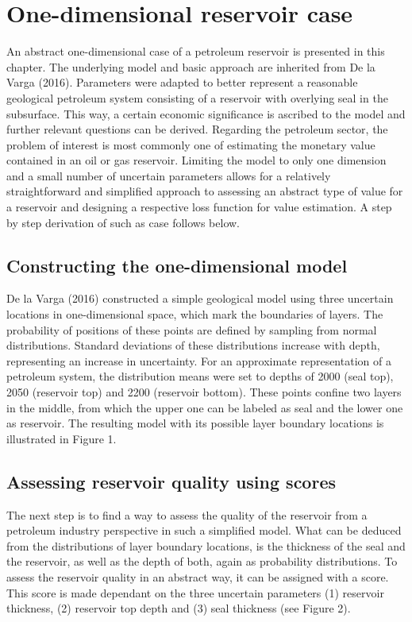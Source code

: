 \chapter{One-dimensional reservoir case}

An abstract one-dimensional case of a petroleum reservoir is presented in this chapter. The underlying model and basic approach are inherited from De la Varga (2016). Parameters were adapted to better represent a reasonable geological petroleum system consisting of a reservoir with overlying seal in the subsurface. This way, a certain economic significance is ascribed to the model and further relevant questions can be derived. Regarding the petroleum sector, the problem of interest is most commonly one of estimating the monetary value contained in an oil or gas reservoir. Limiting the model to only one dimension and a small number of uncertain parameters allows for a relatively straightforward and simplified approach to assessing an abstract type of value for a reservoir and designing a respective loss function for value estimation. A step by step derivation of such as case follows below.

	\section{Constructing the one-dimensional model}
	
	De la Varga (2016) constructed a simple geological model using three uncertain locations in one-dimensional space, which mark the boundaries of layers. The probability of positions of these points are defined by sampling from normal distributions. Standard deviations of these distributions increase with depth, representing an increase in uncertainty. For an approximate representation of a petroleum system, the distribution means were set to depths of 2000 (seal top), 2050 (reservoir top) and 2200 (reservoir bottom). These points confine two layers in the middle, from which the upper one can be labeled as seal and the lower one as reservoir. The resulting model with its possible layer boundary locations is illustrated in Figure 1.
	
	\section{Assessing reservoir quality using scores}
	
	The next step is to find a way to assess the quality of the reservoir from a petroleum industry perspective in such a simplified model. What can be deduced from the distributions of layer boundary locations, is the thickness of the seal and the reservoir, as well as the depth of both, again as probability distributions. To assess the reservoir quality in an abstract way, it can be assigned with a score. This score is made dependant on the three uncertain parameters (1) reservoir thickness, (2) reservoir top depth and (3) seal thickness (see Figure 2).
	
